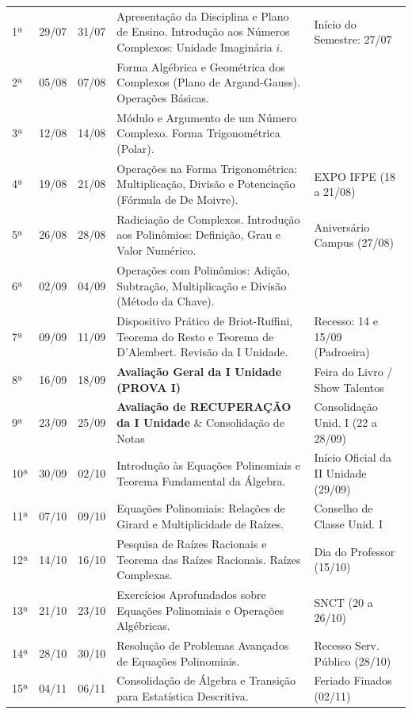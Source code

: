 \documentclass[10pt,a4paper]{article}
\begin{document}
\begin{longtable}{p{0.8cm} p{1.8cm} p{1.8cm} p{7.5cm} p{4.2cm}}
1ª & 29/07 & 31/07 & Apresentação da Disciplina e Plano de Ensino. Introdução aos Números Complexos: Unidade Imaginária $i$. & Início do Semestre: 27/07 \\
\rowcolor{lightgrey}
2ª & 05/08 & 07/08 & Forma Algébrica e Geométrica dos Complexos (Plano de Argand-Gauss). Operações Básicas. & \\
3ª & 12/08 & 14/08 & Módulo e Argumento de um Número Complexo. Forma Trigonométrica (Polar). & \\
\rowcolor{lightgrey}
4ª & 19/08 & 21/08 & Operações na Forma Trigonométrica: Multiplicação, Divisão e Potenciação (Fórmula de De Moivre). & EXPO IFPE (18 a 21/08) \\
5ª & 26/08 & 28/08 & Radiciação de Complexos. Introdução aos Polinômios: Definição, Grau e Valor Numérico. & Aniversário Campus (27/08) \\
\rowcolor{lightgrey}
6ª & 02/09 & 04/09 & Operações com Polinômios: Adição, Subtração, Multiplicação e Divisão (Método da Chave). & \\
7ª & 09/09 & 11/09 & Dispositivo Prático de Briot-Ruffini, Teorema do Resto e Teorema de D'Alembert. Revisão da I Unidade. & Recesso: 14 e 15/09 (Padroeira) \\
\rowcolor{lightgrey}
8ª & 16/09 & 18/09 & \textbf{Avaliação Geral da I Unidade (PROVA I)} & Feira do Livro / Show Talentos \\
9ª & 23/09 & 25/09 & \textbf{Avaliação de RECUPERAÇÃO da I Unidade} \& Consolidação de Notas & Consolidação Unid. I (22 a 28/09) \\
\rowcolor{lightgrey}
10ª & 30/09 & 02/10 & Introdução às Equações Polinomiais e Teorema Fundamental da Álgebra. & Início Oficial da II Unidade (29/09) \\
11ª & 07/10 & 09/10 & Equações Polinomiais: Relações de Girard e Multiplicidade de Raízes. & Conselho de Classe Unid. I \\
\rowcolor{lightgrey}
12ª & 14/10 & 16/10 & Pesquisa de Raízes Racionais e Teorema das Raízes Racionais. Raízes Complexas. & Dia do Professor (15/10) \\
13ª & 21/10 & 23/10 & Exercícios Aprofundados sobre Equações Polinomiais e Operações Algébricas. & SNCT (20 a 26/10) \\
\rowcolor{lightgrey}
14ª & 28/10 & 30/10 & Resolução de Problemas Avançados de Equações Polinomiais. & Recesso Serv. Público (28/10) \\
15ª & 04/11 & 06/11 & Consolidação de Álgebra e Transição para Estatística Descritiva. & Feriado Finados (02/11) \\

\end{longtable}
\end{document}
